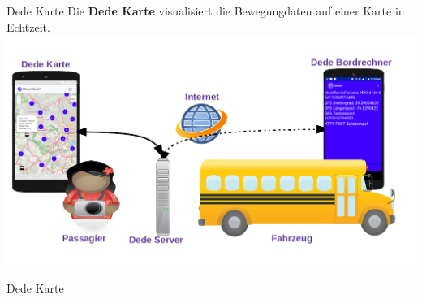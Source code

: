 
\begin{frame}{Dede Karte}
  Die \textbf{Dede Karte} visualisiert die Bewegungdaten auf einer Karte in Echtzeit.
  \includegraphics[width=0.9\paperwidth]{dede/dede-concept}
\end{frame}

\bgroup


\begin{frame}{Dede Karte}
\end{frame}

\egroup
